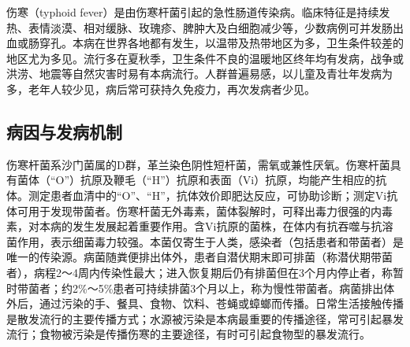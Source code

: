 伤寒（typhoid
fever）是由伤寒杆菌引起的急性肠道传染病。临床特征是持续发热、表情淡漠、相对缓脉、玫瑰疹、脾肿大及白细胞减少等，少数病例可并发肠出血或肠穿孔。本病在世界各地都有发生，以温带及热带地区为多，卫生条件较差的地区尤为多见。流行多在夏秋季，卫生条件不良的温暖地区终年均有发病，战争或洪涝、地震等自然灾害时易有本病流行。人群普遍易感，以儿童及青壮年发病为多，老年人较少见，病后常可获持久免疫力，再次发病者少见。

\subsection{病因与发病机制}

伤寒杆菌系沙门菌属的D群，革兰染色阴性短杆菌，需氧或兼性厌氧。伤寒杆菌具有菌体（“O”）抗原及鞭毛（“H”）抗原和表面（Vi）抗原，均能产生相应的抗体。测定患者血清中的“O”、“H”，抗体效价即肥达反应，可协助诊断；测定Vi抗体可用于发现带菌者。伤寒杆菌无外毒素，菌体裂解时，可释出毒力很强的内毒素，对本病的发生发展起着重要作用。含Vi抗原的菌株，在体内有抗吞噬与抗溶菌作用，表示细菌毒力较强。本菌仅寄生于人类，感染者（包括患者和带菌者）是唯一的传染源。病菌随粪便排出体外，患者自潜伏期末即可排菌（称潜伏期带菌者），病程2～4周内传染性最大；进入恢复期后仍有排菌但在3个月内停止者，称暂时带菌者；约2\%～5\%患者可持续排菌3个月以上，称为慢性带菌者。病菌排出体外后，通过污染的手、餐具、食物、饮料、苍蝇或蟑螂而传播。日常生活接触传播是散发流行的主要传播方式；水源被污染是本病最重要的传播途径，常可引起暴发流行；食物被污染是传播伤寒的主要途径，有时可引起食物型的暴发流行。

